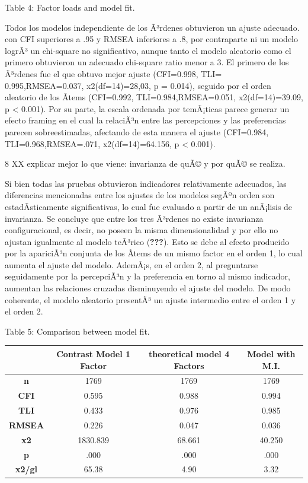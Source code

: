\documentclass[
]{article}
\begin{document}
Table 4: Factor loads and model fit.

Todos los modelos independiente de los Ã³rdenes obtuvieron un ajuste
adecuado. con CFI superiores a .95 y RMSEA inferiores a .8, por
contraparte ni un modelo logrÃ³ un chi-square no significativo, aunque
tanto el modelo aleatorio como el primero obtuvieron un adecuado
chi-square ratio menor a 3. El primero de los Ã³rdenes fue el que obtuvo
mejor ajuste (CFI=0.998, TLI= 0.995,RMSEA=0.037, x2(df=14)=28,03, p =
0.014), seguido por el orden aleatorio de los Ã­tems (CFI=0.992,
TLI=0.984,RMSEA=0.051, x2(df=14)=39.09, p \textless{} 0.001). Por su
parte, la escala ordenada por temÃ¡ticas parece generar un efecto
framing en el cual la relaciÃ³n entre las percepciones y las
preferencias parecen sobreestimadas, afectando de esta manera el ajuste
(CFI=0.984, TLI=0.968,RMSEA=.071, x2(df=14)=64.156, p \textless{}
0.001).

8 XX explicar mejor lo que viene: invarianza de quÃ© y por quÃ© se
realiza.

Si bien todas las pruebas obtuvieron indicadores relativamente
adecuados, las diferencias mencionadas entre los ajustes de los modelos
segÃºn orden son estadÃ­sticamente significativas, lo cual fue evaluado
a partir de un anÃ¡lisis de invarianza. Se concluye que entre los tres
Ã³rdenes no existe invarianza configuracional, es decir, no poseen la
misma dimensionalidad y por ello no ajustan igualmente al modelo
teÃ³rico ({\textbf{???}}). Esto se debe al efecto producido por la
apariciÃ³n conjunta de los Ã­tems de un mismo factor en el orden 1, lo
cual aumenta el ajuste del modelo. AdemÃ¡s, en el orden 2, al
preguntarse seguidamente por la percepciÃ³n y la preferencia en torno al
mismo indicador, aumentan las relaciones cruzadas disminuyendo el ajuste
del modelo. De modo coherente, el modelo aleatorio presentÃ³ un ajuste
intermedio entre el orden 1 y el orden 2.

Table 5: Comparison between model fit.

\begin{longtable}[]{@{}cccc@{}}
\toprule
& Contrast Model 1 Factor & theoretical model 4 Factors & Model with
M.I.\tabularnewline
\midrule
\endhead
\textbf{n} & 1769 & 1769 & 1769\tabularnewline
\textbf{CFI} & 0.595 & 0.988 & 0.994\tabularnewline
\textbf{TLI} & 0.433 & 0.976 & 0.985\tabularnewline
\textbf{RMSEA} & 0.226 & 0.047 & 0.036\tabularnewline
\textbf{x2} & 1830.839 & 68.661 & 40.250\tabularnewline
\textbf{p} & .000 & .000 & .000\tabularnewline
\textbf{x2/gl} & 65.38 & 4.90 & 3.32\tabularnewline
\bottomrule
\end{longtable}
\end{document}
